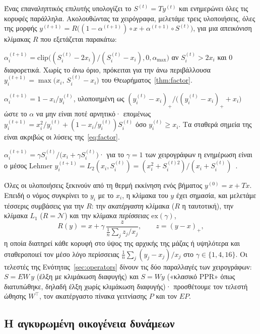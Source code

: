 \documentclass[11pt,a4paper]{article}
\theoremstyle{definition}
\theoremstyle{plain}
\newcommand{\clip}{\mathrm{clip}}
\newcommand{\N}{\mathcal{N}}
\begin{document}
Ένας επαναληπτικός επιλυτής υπολογίζει το $S^{(t)}=Ty^{(t)}$ και ενημερώνει όλες τις κορυφές παράλληλα. Ακολουθώντας τα χειρόγραφα, μελετάμε τρεις υλοποιήσεις, όλες της μορφής $y^{(t+1)}=R\big((1-\alpha^{(t+1)})\circ x+\alpha^{(t+1)}\circ S^{(t)}\big)$, για μια απεικόνιση κλίμακας $R$ που εξετάζεται παρακάτω:
\begin{description}[leftmargin=1.2em,style=nextline]
\item[Υλοποίηση Α (ταυτόχρονη ρίζα).] $\alpha_i^{(t+1)}=\clip\big((S_i^{(t)}-2x_i)/(S_i^{(t)}-x_i),0,\alpha_{\max}\big)$ αν $S_i^{(t)}>2x_i$ και $0$ διαφορετικά. Χωρίς το άνω όριο, πρόκειται για την άνω περιβάλλουσα $y_i^{(t+1)}=\max\big(x_i,\,S_i^{(t)}-x_i\big)$ του Θεωρήματος~\ref{thm:factor}.
\item[Υλοποίηση Β (χρονικά υστερημένη).] $\alpha_i^{(t+1)}=1-x_i/y_i^{(t)}$, υλοποιημένη ως $(y_i^{(t)}-x_i)_+/\big((y_i^{(t)}-x_i)_++x_i\big)$ ώστε το $\alpha$ να μην είναι ποτέ αρνητικό· επομένως $y_i^{(t+1)}=x_i^2/y_i^{(t)}+(1-x_i/y_i^{(t)})S_i^{(t)}$ όσο $y_i^{(t)}\ge x_i$. Τα σταθερά σημεία της είναι ακριβώς οι λύσεις της~\eqref{eq:factor}.
\item[Υλοποίηση Γ (άμεσο σήμα γειτόνων).] $\alpha_i^{(t+1)}=\gamma S_i^{(t)}/\big(x_i+\gamma S_i^{(t)}\big)$· για το $\gamma=1$ των χειρογράφων η ενημέρωση είναι ο μέσος Lehmer $y_i^{(t+1)}=L_2(x_i,S_i^{(t)})=(x_i^2+S_i^{(t)2})/(x_i+S_i^{(t)})$~\cite{lehmer71}.
\end{description}
Όλες οι υλοποιήσεις ξεκινούν από τη θερμή εκκίνηση ενός βήματος $y^{(0)}=x+Tx$. Επειδή ο νόμος συγκρίνει το $y_i$ με το $x_i$, η κλίμακα του $y$ έχει σημασία, και μελετάμε τέσσερις συμβάσεις για την $R$: την \emph{ακατέργαστη} κλίμακα ($R$ η ταυτοτική), την κλίμακα \emph{$L_1$} ($R=\N$) και την κλίμακα \emph{περίσσειας} $\mathrm{ex}(\gamma)$,
\begin{equation}\label{eq:excess}
R(y)=x+\gamma\,\frac{z}{\tfrac1n\sum_jz_j/x_j},\qquad z=(y-x)_+,
\end{equation}
η οποία διατηρεί κάθε κορυφή στο ύψος της αρχικής της μάζας ή υψηλότερα και σταθεροποιεί τον μέσο λόγο περίσσειας $\tfrac1n\sum_j(y_j-x_j)/x_j$ στο $\gamma\in\{1,4,16\}$. Οι τελεστές της Ενότητας~\ref{sec:operators} δίνουν τις δύο παραλλαγές των χειρογράφων: $S=EW\,y$ (έλξη με κλιμάκωση διαφυγής) και $S=Wy$ («κλασικό PPR» όπως διατυπώθηκε, δηλαδή έλξη χωρίς κλιμάκωση διαφυγής)· προσθέτουμε τον τελεστή ώθησης $W^{\top}$, τον ακατέργαστο πίνακα γειτνίασης $P$ και τον $EP$.

\subsection{Η αγκυρωμένη οικογένεια δυνάμεων}\label{sec:ap}
\end{document}

